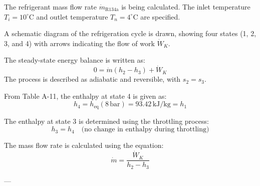 The refrigerant mass flow rate \( \dot{m}_{\text{R134a}} \) is being calculated. The inlet temperature \( T_i = 10^\circ\text{C} \) and outlet temperature \( T_n = 4^\circ\text{C} \) are specified.  

A schematic diagram of the refrigeration cycle is drawn, showing four states (1, 2, 3, and 4) with arrows indicating the flow of work \( \dot{W}_K \).  

The steady-state energy balance is written as:  
\[
0 = \dot{m} (h_2 - h_3) + \dot{W}_K
\]  
The process is described as adiabatic and reversible, with \( s_2 = s_3 \).  

From Table A-11, the enthalpy at state 4 is given as:  
\[
h_4 = h_{\text{eq}}(8 \, \text{bar}) = 93.42 \, \text{kJ/kg} = h_1
\]  

The enthalpy at state 3 is determined using the throttling process:  
\[
h_3 = h_4 \quad \text{(no change in enthalpy during throttling)}
\]  

The mass flow rate is calculated using the equation:  
\[
\dot{m} = \frac{\dot{W}_K}{h_2 - h_3}
\]  

---